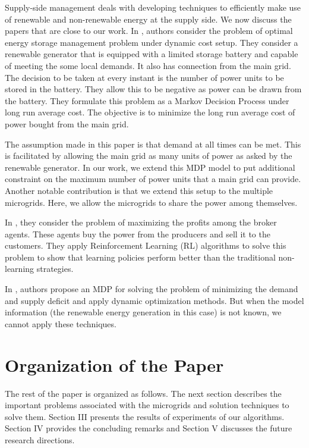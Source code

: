 Supply-side management deals with developing techniques to efficiently make use of renewable and non-renewable energy at the supply side. We now discuss the papers that are close to our work. In \cite{PHarsha}, authors consider the problem of optimal energy storage management problem under dynamic cost setup. They consider a renewable generator that is equipped with a limited storage battery and capable of meeting the some local demands. It also has connection from the main grid. The decision to be taken at every instant is the number of power units to be stored in the battery. They allow this to be negative as power can be drawn from the battery. They formulate this problem as a Markov Decision Process under long run average cost. The objective is to minimize the long run average cost of power bought from the main grid.

The assumption made in this paper is that demand at all times can be met. This is facilitated by allowing the main grid as many units of power as asked by the renewable generator. In our work, we extend this MDP model to put additional constraint on the maximum number of power units that a main grid can provide. Another notable contribution is that we extend this setup to the multiple microgrids. Here, we allow the microgrids to share the power among themselves.  

In \cite{reddy2011learned}, they consider the problem of maximizing the profits among the broker agents. These agents buy the power from the producers and sell it to the customers. They apply Reinforcement Learning (RL) algorithms to solve this problem to show that learning policies perform better than the traditional non-learning strategies.

In \cite{goodmdp}, authors propose an MDP for solving the problem of minimizing the demand and supply deficit  
and apply dynamic optimization methods. But when the model information (the renewable energy generation in this case) is not known, we cannot apply these techniques.

\section*{Organization of the Paper}	
The rest of the paper is organized as follows. The next section describes the important problems associated with the microgrids and solution techniques to solve them. Section III presents the results of experiments of our algorithms. Section IV provides the concluding remarks and Section V discusses the future research directions.